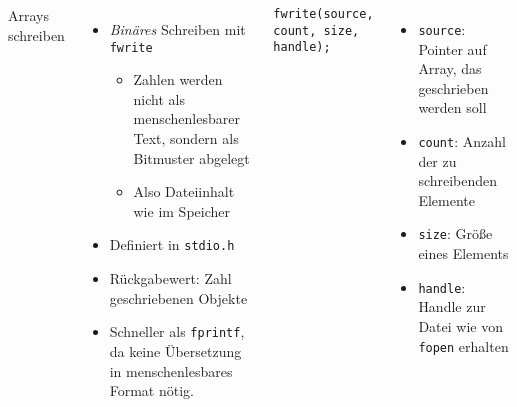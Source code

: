 \begin{frame}[fragile]
%
\begin{columns}[T]
\begin{Large}
Arrays schreiben
\vspace{10pt}
\end{Large}
%
\begin{itemize}
\item \emph{Binäres} Schreiben mit \texttt{fwrite}
\begin{itemize}
	\item Zahlen werden nicht als menschenlesbarer Text, sondern als Bitmuster abgelegt
	\item Also Dateiinhalt wie im Speicher
\end{itemize}
\item Definiert in \texttt{stdio.h}
\item Rückgabewert: Zahl geschriebenen Objekte
\item Schneller als \texttt{fprintf}, da keine Übersetzung in menschenlesbares Format nötig.
\end{itemize}
%
\begin{codebox}[Syntax]
\begin{verbatim}
fwrite(source, count, size, handle);
\end{verbatim}
\end{codebox}
%
\begin{itemize}
\item \texttt{source}: Pointer auf Array, das geschrieben werden soll
\item \texttt{count}: Anzahl der zu schreibenden Elemente
\item \texttt{size}: Größe eines Elements
\item \texttt{handle}: Handle zur Datei wie von \texttt{fopen} erhalten
\end{itemize}
\end{columns}
%
\end{frame}



